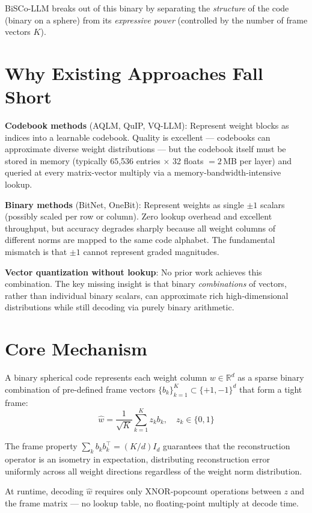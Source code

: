 \documentclass[10pt,twocolumn]{article}
\begin{document}
BiSCo-LLM breaks out of this binary by separating the \emph{structure}
of the code (binary on a sphere) from its \emph{expressive power}
(controlled by the number of frame vectors $K$).

\section{Why Existing Approaches Fall Short}

\textbf{Codebook methods} (AQLM, QuIP, VQ-LLM): Represent weight blocks
as indices into a learnable codebook. Quality is excellent --- codebooks
can approximate diverse weight distributions --- but the codebook itself
must be stored in memory (typically 65,536 entries $\times$ 32 floats
$= 2$\,MB per layer) and queried at every matrix-vector multiply via
a memory-bandwidth-intensive lookup.

\textbf{Binary methods} (BitNet, OneBit): Represent weights as single
$\pm1$ scalars (possibly scaled per row or column). Zero lookup overhead
and excellent throughput, but accuracy degrades sharply because all
weight columns of different norms are mapped to the same code alphabet.
The fundamental mismatch is that $\pm1$ cannot represent graded
magnitudes.

\textbf{Vector quantization without lookup}: No prior work achieves
this combination. The key missing insight is that binary \emph{combinations}
of vectors, rather than individual binary scalars, can approximate
rich high-dimensional distributions while still decoding via purely
binary arithmetic.

\section{Core Mechanism}

A binary spherical code represents each weight column $w \in \mathbb{R}^d$
as a sparse binary combination of pre-defined frame vectors
$\{b_k\}_{k=1}^K \subset \{+1,-1\}^d$ that form a tight frame:
\[
\hat{w} = \frac{1}{\sqrt{K}} \sum_{k=1}^K z_k b_k, \quad z_k \in \{0,1\}
\]

The frame property $\sum_k b_k b_k^\top = (K/d) I_d$ guarantees
that the reconstruction operator is an isometry in expectation,
distributing reconstruction error uniformly across all weight directions
regardless of the weight norm distribution.

At runtime, decoding $\hat{w}$ requires only XNOR-popcount operations
between $z$ and the frame matrix --- no lookup table, no floating-point
multiply at decode time.
\end{document}
